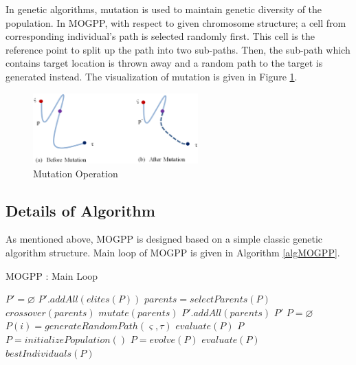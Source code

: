 \documentclass[10pt,journal]{IEEEtran}
\begin{document}
In genetic algorithms, mutation is used to maintain genetic diversity of the population. In MOGPP, with respect to given chromosome structure; a cell from corresponding individual's path is selected randomly first. This cell is the reference point to split up the path into two sub-paths. Then, the sub-path which contains target location is thrown away and a random path to the target is generated instead. The visualization of mutation is given in Figure \ref{fig:mutation}.

\begin{figure}
\centering
\includegraphics[width=2.5in]{mogpp/newMutation}
\caption{Mutation Operation}
\label{fig:mutation}
\end{figure}

\subsection{Details of Algorithm}

As mentioned above, MOGPP is designed based on a simple classic genetic algorithm structure. Main loop of MOGPP is given in Algorithm \ref{algMOGPP}.

\begin{algorithm}
	\caption{MOGPP : Main Loop}
	\label{algMOGPP}
    \begin{algorithmic}[1]
	  	\State $P' = \varnothing$
	  	\State $P'.addAll(elites(P))$
	  		\State $parents = selectParents(P)$
	  		\State $crossover(parents)$
	  		\State $mutate(parents)$
		  	\State $P'.addAll(parents)$
	  	\EndWhile
	  	\State \Return $P'$
      \EndFunction
   	  \Statex
      	\State $P = \varnothing$
      		\State $P(i) = generateRandomPath(\varsigma, \tau)$
      	\EndFor
      	\State $evaluate(P)$
		\State \Return $P$
	  \EndFunction
	  \Statex
      	\State $P = initializePopulation()$
    	      	\State $P = evolve(P)$
    	      	\State $evaluate(P)$
		\EndWhile
		\State \Return $bestIndividuals(P)$
  	  \EndFunction
	\end{algorithmic}
\end{algorithm}
\end{document}
